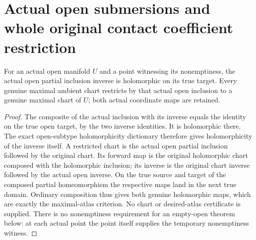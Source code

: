\section{Actual open submersions and whole original contact coefficient restriction}

\begin{lemma}
\label{hir:submersion-contact-restriction-open-charts}
\leanok
For an actual open manifold $U$ and a point witnessing its nonemptiness, the
actual open partial inclusion inverse is holomorphic on its true target.
Every genuine maximal ambient chart restricts by that actual open inclusion
to a genuine maximal chart of $U$; both actual coordinate maps are retained.
\end{lemma}
\begin{proof}
The composite of the actual inclusion with its inverse equals the identity
on the true open target, by the two inverse identities. It is holomorphic
there. The exact open-subtype holomorphicity dictionary therefore gives
holomorphicity of the inverse itself. A restricted chart is the actual open
partial inclusion followed by the original chart. Its forward map is the
original holomorphic chart composed with the holomorphic inclusion; its
inverse is the original chart inverse followed by the actual open inverse.
On the true source and target of the composed partial homeomorphism the
respective maps land in the next true domain. Ordinary composition thus
gives both genuine holomorphic maps, which are exactly the maximal-atlas
criterion. No chart or desired-atlas certificate is supplied. There is no
nonemptiness requirement for an empty-open theorem below: at each actual
point the point itself supplies the temporary nonemptiness witness.
\end{proof}

